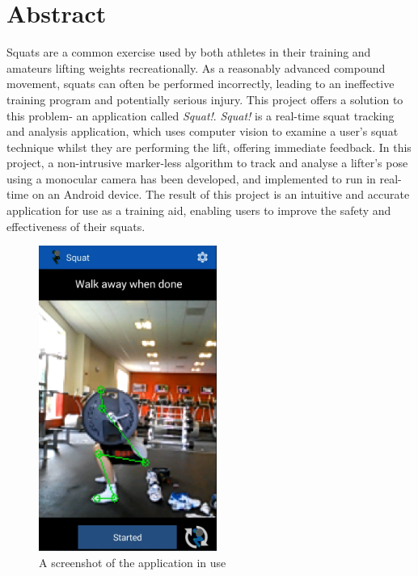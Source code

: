 \section*{Abstract}

Squats are a common exercise used by both athletes in their training and amateurs lifting weights recreationally. As a reasonably advanced compound movement, squats can often be performed incorrectly, leading to an ineffective training program and potentially serious injury. This project offers a solution to this problem- an application called \emph{Squat!}. \emph{Squat!} is a real-time squat tracking and analysis application, which uses computer vision to examine a user's squat technique whilst they are performing the lift, offering immediate feedback. In this project, a non-intrusive marker-less algorithm to track and analyse a lifter's pose using a monocular camera has been developed, and implemented to run in real-time on an Android device. The result of this project is an intuitive and accurate application for use as a training aid, enabling users to improve the safety and effectiveness of their squats.

\begin{figure}[H]
    \centering
	\includegraphics[height=10cm]{application/images/belowparallel}
\caption{A screenshot of the application in use}
\label{fig:preview}
\end{figure}
